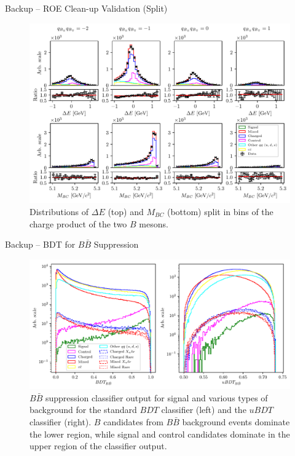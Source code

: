 \documentclass[serif]{beamer}
\begin{document}
\begin{frame}[t]{Backup -- ROE Clean-up Validation (Split)}
\vspace{-3mm}
\small
\begin{figure}[H]
	\centering
	\includegraphics[width=0.8\linewidth]{fig/roe_val_split}
	\caption{Distributions of $\Delta E$ (top) and $M_{BC}$ (bottom) split in bins of the charge product of the two $B$ mesons.}
\end{figure}
\end{frame}

\begin{frame}[t]{Backup -- BDT for $B \bar B$ Suppression}
\vspace{-3mm}
\small
\begin{figure}[H]
	\centering
	\includegraphics[width=0.9\linewidth]{fig/bb_BDT}
	\caption{$B\bar B$ suppression classifier output for signal and various types of background for the standard $BDT$ classifier (left) and the $uBDT$ classifier (right). $B$ candidates from $B\bar B$ background events dominate the lower region, while signal and control candidates dominate in the upper region of the classifier output.}
\end{figure}
\end{frame}
\end{document}
